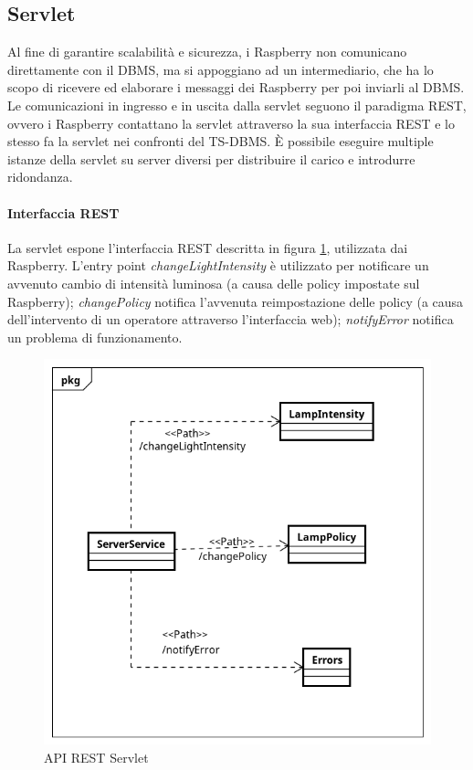 \subsection{Servlet}
Al fine di garantire scalabilità e sicurezza, i Raspberry non comunicano direttamente con il DBMS, ma si appoggiano ad un intermediario, che ha lo scopo di ricevere ed elaborare i messaggi dei Raspberry per poi inviarli al DBMS.
Le comunicazioni in ingresso e in uscita dalla servlet seguono il paradigma REST, ovvero i Raspberry contattano la servlet attraverso la sua interfaccia REST e lo stesso fa la servlet nei confronti del TS-DBMS.
È possibile eseguire multiple istanze della servlet su server diversi per distribuire il carico e introdurre ridondanza.
\paragraph{Interfaccia REST}
La servlet espone l'interfaccia REST descritta in figura \ref{API REST SERVLET}, utilizzata dai Raspberry.
L'entry point \textit{changeLightIntensity} è utilizzato per notificare un avvenuto cambio di intensità luminosa (a causa delle policy impostate sul Raspberry); \textit{changePolicy} notifica l'avvenuta reimpostazione delle policy (a causa dell'intervento di un operatore attraverso l'interfaccia web); \textit{notifyError} notifica un problema di funzionamento.
\begin{figure}[tbp]
	\centering
	\includegraphics[scale=.8]{figure/Class_Diagram_Server_REST.png}
	\caption{API REST Servlet \label{API REST SERVLET}}
\end{figure}
